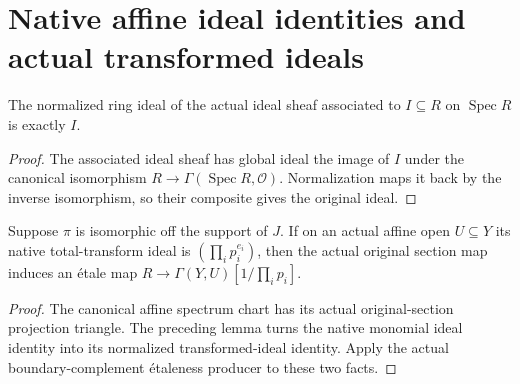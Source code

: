 \section{Native affine ideal identities and actual transformed ideals}

\begin{lemma}\label{lem:sc0-normalized-spec-ideal}
\leanok
The normalized ring ideal of the actual ideal sheaf associated to $I\subseteq R$
on $\operatorname{Spec}R$ is exactly $I$.
\end{lemma}
\begin{proof}
The associated ideal sheaf has global ideal the image of $I$ under the canonical
isomorphism $R\to\Gamma(\operatorname{Spec}R,\mathcal O)$. Normalization maps it
back by the inverse isomorphism, so their composite gives the original ideal.
\end{proof}

\begin{corollary}\label{cor:sc0-native-monomial-boundary-etale}
\leanok
{}
Suppose $\pi$ is isomorphic off the support of $J$. If on an actual affine open
$U\subseteq Y$ its native total-transform ideal is $(\prod_i p_i^{e_i})$, then
the actual original section map induces an \'etale map
$R\to\Gamma(Y,U)[1/\prod_i p_i]$.
\end{corollary}
\begin{proof}
The canonical affine spectrum chart has its actual original-section projection
triangle. The preceding lemma turns the native monomial ideal identity into its
normalized transformed-ideal identity. Apply the actual boundary-complement
\'etaleness producer to these two facts.
\end{proof}

